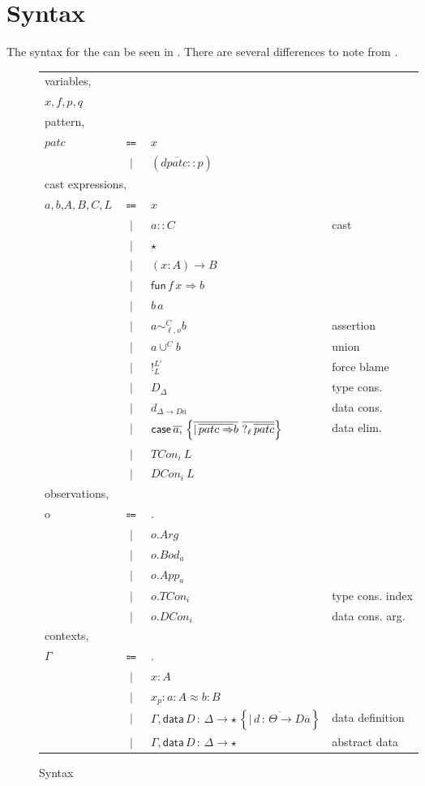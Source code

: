 \section{Syntax}

The syntax for the \clang{} can be seen in .
There are several differences to note from .

\begin{figure}
  \begin{tabular}{lcll}

\multicolumn{3}{l}{variables,} & \tabularnewline
  $x,f,p,q$ &  &  & \tabularnewline
\multicolumn{3}{l}{pattern, } & \tabularnewline
  $patc$ & $\Coloneqq$ & $x$ & \tabularnewline
    & $|$ & $\left(d\overline{patc}::p\right)$ & \tabularnewline
  \multicolumn{3}{l}{cast expressions,} & \tabularnewline
  $a,b$,$A,B,C,L$ & $\Coloneqq$ & $x$ & \tabularnewline
    & $|$ & $a::C$ & cast\tabularnewline
    & $|$ & $\star$ & \tabularnewline
    & $|$ & $\left(x:A\right)\rightarrow B$ & \tabularnewline
    & $|$ & $\mathsf{fun}\,f\,x\Rightarrow b$ & \tabularnewline
    & $|$ & $b\,a$ & \tabularnewline
    & $|$ & $a\sim_{\ell,o}^{C}b$ & assertion\tabularnewline
    & $|$ & $a\cup^{C}b$ & union\tabularnewline
    & $|$ & $!_{L}^{L'}$ & force blame\tabularnewline
    & $|$ & $D_{\Delta}$ & type cons.\tabularnewline
    & $|$ & $d_{\Delta\rightarrow D\overline{a}}$ & data cons.\tabularnewline
    & $|$ & $\case{} \,\overline{a,}\,\left\{ \overline{|\,\overline{patc\Rightarrow}b}\ \overline{?_{\ell}\,\overline{patc}} \right\} $ & data elim.\tabularnewline
    & $|$ & $TCon_{i}\ L$ & \tabularnewline
    & $|$ & $DCon_{i}\ L$ & \tabularnewline
  \multicolumn{4}{l}{observations,}\tabularnewline
  o & $\Coloneqq$ & . & \tabularnewline
    & $|$ & $o.Arg$ & \tabularnewline
    & $|$ & $o.Bod_{a}$ & \tabularnewline
    & $|$ & $o.App_{a}$ & \tabularnewline
    & $|$ & $o.TCon_{i}$ & type cons. index\tabularnewline
    & $|$ & $o.DCon_{i}$ & data cons. arg.\tabularnewline
  \multicolumn{4}{l}{contexts,}\tabularnewline
    $\varGamma$ & $\Coloneqq$ & . & \tabularnewline
      & $|$ & $x:A$ & \tabularnewline
      & $|$ & $x_{p}:a:A\approx b:B$ & \tabularnewline
      & $|$ & $\Gamma,\mathsf{data}\,D\,:\,\Delta\rightarrow\star\,\left\{ \overline{|\,d\,:\,\varTheta\rightarrow D\overline{a}}\right\} $ & data definition\tabularnewline
      & $|$ & $\Gamma,\mathsf{data}\,D\,:\,\Delta\rightarrow\star$ & abstract data\tabularnewline
  \end{tabular}
\caption{\CLang{} Syntax}
\label{fig:cast-data-pre-syntax}
\end{figure}

